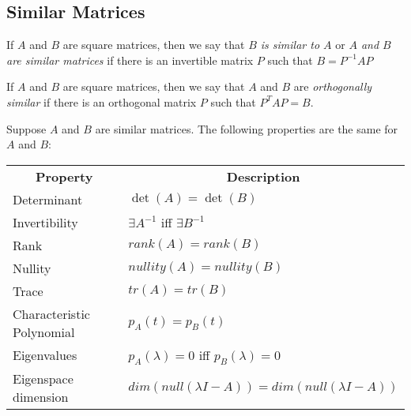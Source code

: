 \documentclass{report}
\begin{document}
		\subsection{Similar Matrices}
		\begin{defn}
			If $A$ and $B$ are square matrices, then we say that \emph{$B$ is similar to $A$} or \emph{$A$ and $B$ are similar matrices} if there is an invertible matrix $P$ such that $B=P^{-1}AP$
		\end{defn}
		
		\begin{defn}
			If $A$ and $B$ are square matrices, then we say that $A$ and $B$ are \emph{orthogonally similar} if there is an orthogonal matrix $P$ such that $P^TAP=B$.
		\end{defn}
		
		\begin{thm}
			Suppose $A$ and $B$ are similar matrices. The following properties are the same for $A$ and $B$: \\
			\begin{tabular}{ll}
				\multicolumn{1}{c}{\textbf{Property}} & \multicolumn{1}{c}{\textbf{Description}}             \\
				Determinant                           & $\det(A)=\det(B)$                                    \\
				Invertibility                         & $\exists A^{-1}$ iff $\exists B^{-1}$                \\
				Rank                                  & $rank(A)=rank(B)$                                    \\
				Nullity                               & $nullity(A)=nullity(B)$                              \\
				Trace                                 & $tr(A)=tr(B)$                                        \\
				Characteristic Polynomial             & $p_A(t)=p_B(t)$                                      \\
				Eigenvalues                           & $p_A(\lambda)=0$ iff $p_B(\lambda)=0$                \\
				Eigenspace dimension                  & $dim(null(\lambda I-A))=dim(null(\lambda I-A))$
			\end{tabular}
		\end{thm}
		
\end{document}
